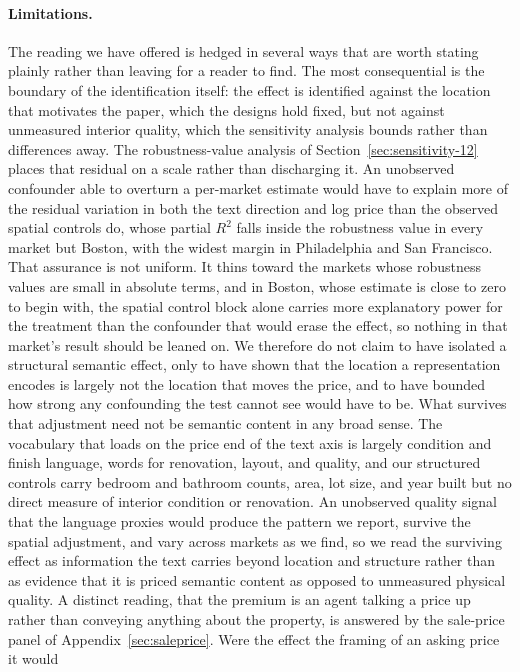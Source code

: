 \paragraph{Limitations.} The reading we have offered is hedged in several ways
that are worth stating plainly rather than leaving for a reader to find. The most
consequential is the boundary of the identification itself: the effect is identified
against the location that motivates the paper, which the designs hold fixed, but not
against unmeasured interior quality, which the sensitivity analysis bounds rather than
differences away. The robustness-value analysis of
Section~\ref{sec:sensitivity-12} places that residual on a scale rather than
discharging it. An unobserved confounder able to overturn a per-market estimate
would have to explain more of the residual variation in both the text direction
and log price than the observed spatial controls do, whose partial $R^2$ falls
inside the robustness value in every market but Boston, with the widest margin in
Philadelphia and San Francisco. That assurance is not
uniform. It thins toward the markets
whose robustness values are small in absolute terms, and in Boston, whose estimate
is close to zero to begin with, the spatial control block alone carries more
explanatory power for the treatment than the confounder that would erase the effect,
so nothing in that market's result should be leaned on. We therefore do not claim to have
isolated a structural semantic effect, only to have shown that the location a
representation encodes is largely not the location that moves the price, and to
have bounded how strong any confounding the test cannot see would have to be. What
survives that adjustment need not be semantic content in any broad sense. The
vocabulary that loads on the price end of the text axis is largely condition and
finish language, words for renovation, layout, and quality, and our structured
controls carry bedroom and bathroom counts, area, lot size, and year built but no
direct measure of interior condition or renovation. An unobserved quality signal
that the language proxies would produce the pattern we report, survive the spatial
adjustment, and vary across markets as we find, so we read the surviving effect as
information the text carries beyond location and structure rather than as evidence
that it is priced semantic content as opposed to unmeasured physical quality. A
distinct reading, that the premium is an agent talking a price up rather than
conveying anything about the property, is answered by the sale-price panel of
Appendix~\ref{sec:saleprice}. Were the effect the framing of an asking price it would
